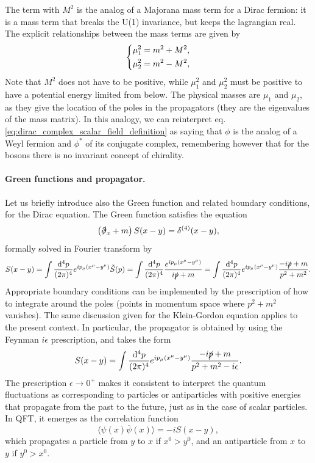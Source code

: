 The term with \(M^2\) is the analog of a Majorana mass term for a Dirac fermion: it is a mass term that breaks the U(1) invariance, but keeps the lagrangian real. The explicit relationships between the mass terms are given by
\[
    \begin{dcases}
        \mu_1^2 = m^2 + M^2, \\
        \mu_2^2 = m^2 - M^2,
    \end{dcases}
\]
Note that \(M^{2}\) does not have to be positive, while \(\mu_1^2\) and \(\mu_2^2\) must be positive to have a potential energy limited from below. The physical masses are \(\mu_1\) and \(\mu_2\), as they give the location of the poles in the propagators (they are the eigenvalues of the mass matrix). In this analogy, we can reinterpret eq. \eqref{eq:dirac_complex_scalar_field_definition} as saying that \(\phi\) is the analog of a Weyl fermion and \(\phi^*\) of its conjugate complex, remembering however that for the bosons there is no invariant concept of chirality.

\paragraph{Green functions and propagator.}

Let us briefly introduce also the Green function and related boundary conditions, for the Dirac equation. The Green function satisfies the equation
\[
    \left(\slashed{\partial}_x + m\right) S(x-y) = \delta^{(4)}(x-y),
\]
formally solved in Fourier transform by
\[
    S(x-y) = \int \frac{\mathrm{d}^4 p}{(2\pi)^4} e^{i p_\mu (x^{\mu}-y^{\mu})} \tilde{S}(p) = \int \frac{\mathrm{d}^4 p}{(2\pi)^4} \frac{e^{i p_\mu (x^{\mu}-y^{\mu})}}{i \slashed{p} + m} = \int \frac{\mathrm{d}^4 p}{(2\pi)^4} e^{i p_\mu (x^{\mu}-y^{\mu})} \frac{-i \slashed{p} + m}{p^2 + m^2}.
\]
Appropriate boundary conditions can be implemented by the prescription of how to integrate around the poles (points in momentum space where \(p^2 + m^2\) vanishes). The same discussion given for the Klein-Gordon equation applies to the present context. In particular, the propagator is obtained by using the Feynman \(i\epsilon\) prescription, and takes the form
\[
    S(x-y) = \int \frac{\mathrm{d}^4 p}{(2\pi)^4} e^{i p_\mu (x^{\mu}-y^{\mu})} \frac{-i \slashed{p} + m}{p^2 + m^2 - i \epsilon}.
\]
The prescription \( \epsilon \to 0^+ \) makes it consistent to interpret the quantum fluctuations as corresponding to particles or antiparticles with positive energies that propagate from the past to the future, just as in the case of scalar particles. In QFT, it emerges as the correlation function
\[
    \langle \psi(x)\overline{\psi}(x)\rangle = -i S(x-y),
\]
which propagates a particle from \(y\) to \(x\) if \(x^0 > y^0\), and an antiparticle from \(x\) to \(y\) if \(y^0 > x^0\).